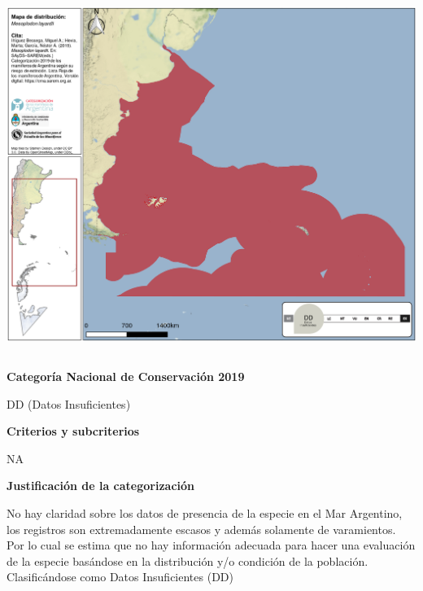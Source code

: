\documentclass[
  x11names]{article}
\begin{document}
\includegraphics[width=1\linewidth]{maps/Cetartiodactyla/Mesoplodon_layardii}

%
\begin{table}[H]
\centering
\begin{tabular}[t]{>{\raggedright\arraybackslash}m{16cm}>{}m{16cm}}
\toprule
\cellcolor{ceil}{\textcolor{white}{\textbf{\rule{0pt}{14pt}CATEGORÍAS DE CONSERVACIÓN}}}\\
\bottomrule
\end{tabular}
\end{table}

\vspace{-0.4cm}

\textbf{Categoría Nacional de Conservación 2019}

DD (Datos Insuficientes)

\textbf{Criterios y subcriterios}

NA

\textbf{Justificación de la categorización}

No hay claridad sobre los datos de presencia de la especie en el Mar
Argentino, los registros son extremadamente escasos y además solamente
de varamientos. Por lo cual se estima que no hay información adecuada
para hacer una evaluación de la especie basándose en la distribución y/o
condición de la población. Clasificándose como Datos Insuficientes (DD)
\end{document}
